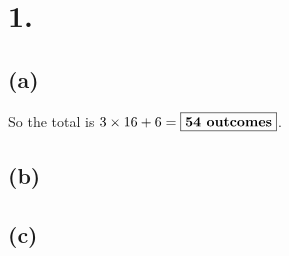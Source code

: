 \documentclass{article}
\begin{document}
\thispagestyle{firstpageheader}
{\Large 

\section*{1.}

\subsection*{(a)} 

So the total is \(3 \times 16 + 6 = \fbox{\textbf{54 outcomes}}\).

\subsection*{(b)}

\subsection*{(c)}

}
\end{document}
